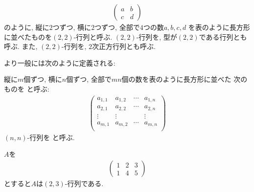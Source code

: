   \begin{align*}
    \begin{pmatrix}
      a&b\\c&d
    \end{pmatrix}
  \end{align*}
  のように, 
  縦に$2$つずつ, 横に$2$つずつ, 全部で$4$つの数$a,b,c,d$
  を表のように長方形に並べたものを$(2,2)$-行列と呼ぶ.
  $(2,2)$-行列を,
  型が$(2,2)$である行列とも呼ぶ.
  また,
  $(2,2)$-行列を, $2$次正方行列とも呼ぶ.

  
  より一般には次のように定義される:
\begin{definition}
  \label{def:mat}
  縦に$m$個ずつ, 横に$n$個ずつ, 全部で$mn$個の数を表のように長方形に並べた
  次のものを
  と呼ぶ:
  \begin{align*}
    \begin{pmatrix}
      a_{1,1}&a_{1,2}&\cdots &a_{1,n}\\
      a_{2,1}&a_{2,2}&\cdots &a_{2,n}\\
      \vdots&\vdots&&\vdots\\
      a_{m,1}&a_{m,2}&\cdots &a_{m,n}\\
    \end{pmatrix}
  \end{align*}
  $(n,n)$-行列を
  と呼ぶ.
\end{definition}

\begin{example}
  $A$を
  \begin{align*}
    \begin{pmatrix}
      1&2&3\\
      1&4&5
    \end{pmatrix}
  \end{align*}
  とすると$A$は$(2,3)$-行列である.
\end{example}

